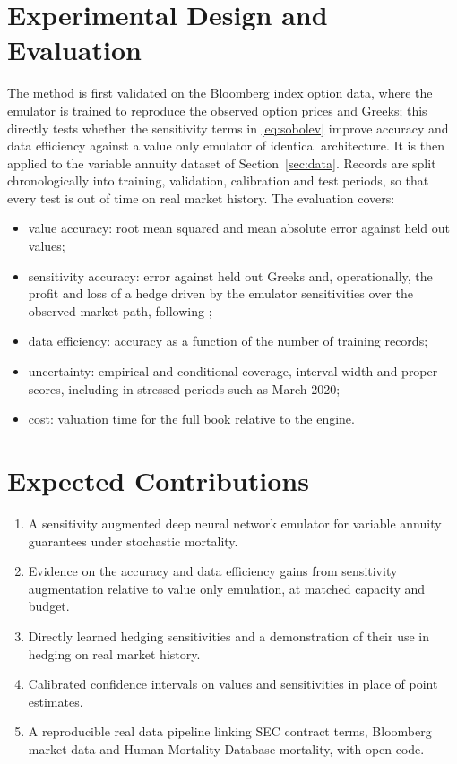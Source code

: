 \documentclass[12pt,a4paper]{article}
\begin{document}
\section{Experimental Design and Evaluation}
The method is first validated on the Bloomberg index option data, where the emulator is trained to reproduce the observed option prices and Greeks; this directly tests whether the sensitivity terms in \eqref{eq:sobolev} improve accuracy and data efficiency against a value only emulator of identical architecture. It is then applied to the variable annuity dataset of Section~\ref{sec:data}. Records are split chronologically into training, validation, calibration and test periods, so that every test is out of time on real market history. The evaluation covers:
\begin{itemize}[leftmargin=*]
\item value accuracy: root mean squared and mean absolute error against held out values;
\item sensitivity accuracy: error against held out Greeks and, operationally, the profit and loss of a hedge driven by the emulator sensitivities over the observed market path, following \citet{hull2017optimal};
\item data efficiency: accuracy as a function of the number of training records;
\item uncertainty: empirical and conditional coverage, interval width and proper scores, including in stressed periods such as March 2020;
\item cost: valuation time for the full book relative to the engine.
\end{itemize}

\section{Expected Contributions}
\begin{enumerate}[label=\arabic*.,leftmargin=*]
\item A sensitivity augmented deep neural network emulator for variable annuity guarantees under stochastic mortality.
\item Evidence on the accuracy and data efficiency gains from sensitivity augmentation relative to value only emulation, at matched capacity and budget.
\item Directly learned hedging sensitivities and a demonstration of their use in hedging on real market history.
\item Calibrated confidence intervals on values and sensitivities in place of point estimates.
\item A reproducible real data pipeline linking SEC contract terms, Bloomberg market data and Human Mortality Database mortality, with open code.
\end{enumerate}
\end{document}
